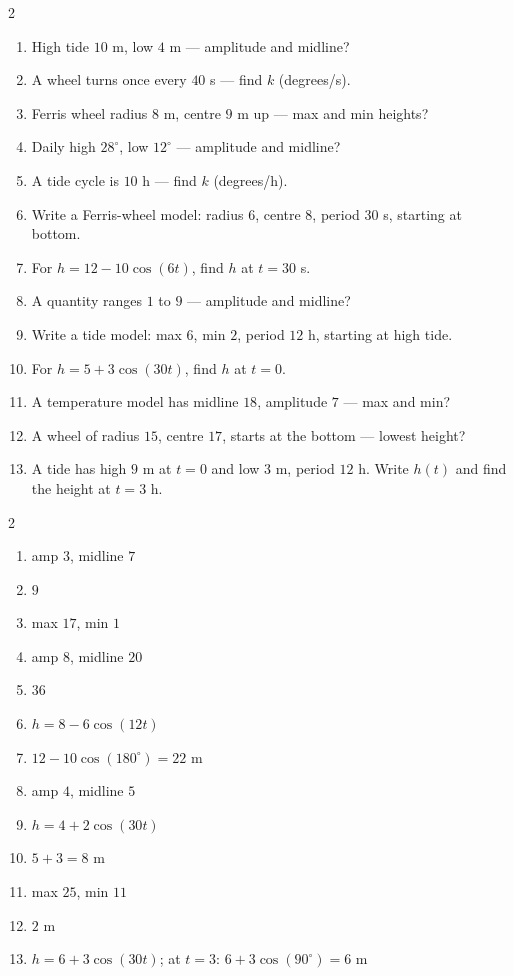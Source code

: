 \documentclass[11pt]{article}
\begin{document}
\begin{recapbox}
\begin{multicols}{2}
\small
\begin{enumerate}[leftmargin=*,itemsep=3pt]
  \item High tide $10$ m, low $4$ m — amplitude and midline?
  \item A wheel turns once every $40$ s — find $k$ (degrees/s).
  \item Ferris wheel radius $8$ m, centre $9$ m up — max and min heights?
  \item Daily high $28^\circ$, low $12^\circ$ — amplitude and midline?
  \item A tide cycle is $10$ h — find $k$ (degrees/h).
  \item Write a Ferris-wheel model: radius $6$, centre $8$, period $30$ s, starting at bottom.
  \item For $h=12-10\cos(6t)$, find $h$ at $t=30$ s.
  \item A quantity ranges $1$ to $9$ — amplitude and midline?
  \item Write a tide model: max $6$, min $2$, period $12$ h, starting at high tide.
  \item For $h=5+3\cos(30t)$, find $h$ at $t=0$.
  \item A temperature model has midline $18$, amplitude $7$ — max and min?
  \item A wheel of radius $15$, centre $17$, starts at the bottom — lowest height?
  \item A tide has high $9$ m at $t=0$ and low $3$ m, period $12$ h. Write $h(t)$ and find the height at $t=3$ h.
\end{enumerate}
\end{multicols}
\end{recapbox}

\begin{keybox}
\begin{multicols}{2}
\small
\begin{enumerate}[leftmargin=*,itemsep=3pt]
  \item amp $3$, midline $7$
  \item $9$
  \item max $17$, min $1$
  \item amp $8$, midline $20$
  \item $36$
  \item $h=8-6\cos(12t)$
  \item $12-10\cos(180^\circ)=22$ m
  \item amp $4$, midline $5$
  \item $h=4+2\cos(30t)$
  \item $5+3=8$ m
  \item max $25$, min $11$
  \item $2$ m
  \item $h=6+3\cos(30t)$; at $t=3$: $6+3\cos(90^\circ)=6$ m
\end{enumerate}
\end{multicols}
\end{keybox}
\end{document}
